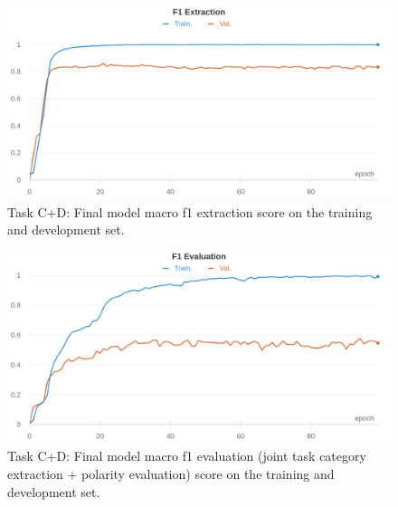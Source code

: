 \documentclass[11pt,a4paper]{article}
\begin{document}
	\begin{figure}[H]
		\centering
		\includegraphics[width=1\columnwidth]{M3_cd_f1_extr.png}
		\caption{Task C+D: Final model macro f1 extraction score on the training and development set.}
		\label{fig:cd_f1_extr}
	\end{figure}

	\begin{figure}[H]
		\centering
		\includegraphics[width=1\columnwidth]{M3_cd_f1_eval.png}
		\caption{Task C+D: Final model macro f1 evaluation (joint task category extraction + polarity evaluation) score on the training and development set.}
		\label{fig:cd_f1_eval}
	\end{figure}
	
	
	
	
	
	
	
\end{document}
